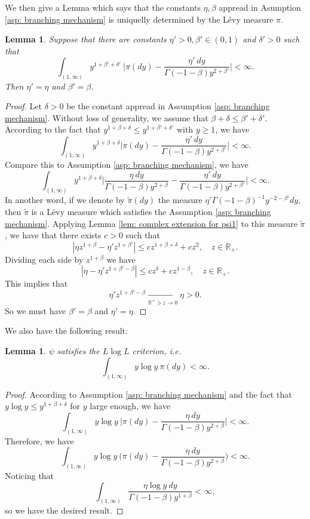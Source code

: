 \documentclass[12pt,a4paper]{amsart}
\theoremstyle{plain}
\newtheorem{lem}[thm]{Lemma}
\theoremstyle{definition}
\numberwithin{equation}{section}
\begin{document}
	We then give a Lemma which says that the constants $\eta, \beta$ appread in Asumption \ref{asp: branching mechanism} is uniquelly determined by the L\'evy measure $\pi$.
\begin{lem}
\label{lem: unique of beta and eta}
	Suppose that there are constants $\eta'>0, \beta'\in (0,1)$ and $\delta' > 0$ such that
\[
	 \int_{(1,\infty)}y^{1+\beta' +\delta'}~\Big|\pi(dy)-\frac{\eta'~dy}{\Gamma(-1-\beta)y^{2+\beta'}}\Big| <\infty.
\]
	Then $\eta'= \eta$ and $\beta ' = \beta$.
\end{lem}
\begin{proof}
	Let $\delta> 0$ be the constant appread in Assumption \ref{asp: branching mechanism}.
	Without loss of generality, we assume that $\beta+\delta \leq \beta'+ \delta'$.
	According to the fact that $y^{1+\beta+ \delta} \leq y^{1+\beta'+\delta'}$ with $y \geq 1$, we have
\[
	\int_{(1,\infty)} y^{1+\beta + \delta} \Big|\pi(dy)-\frac{\eta'~dy}{\Gamma(-1-\beta)y^{2+\beta'}}\Big| <\infty.
\]
	Compare this to Assumption \ref{asp: branching mechanism}, we have
\[
	\int_{(1,\infty)} y^{1+\beta + \delta} \Big|\frac{\eta~dy}{\Gamma(-1-\beta)y^{2+\beta}}-\frac{\eta'~dy}{\Gamma(-1-\beta)y^{2+\beta'}}\Big| <\infty.
\]
	In another word, if we denote by $\tilde \pi(dy)$ the measure $\eta' \Gamma(-1-\beta)^{-1} y^{-2-\beta'} dy$, then $\tilde \pi$ is a L\'evy measure which satisfies the Assumption \ref{asp: branching mechanism}.
	Applying Lemma \ref{lem: complex extension for psi1} to this measure $\tilde \pi$, we have that there exists $c>0$ such that
\[
	|\eta z^{1+\beta} - \eta' z^{1+\beta'} | 
	\leq cz^{1+\beta+ \delta}+cz^2,
	\quad z \in \mathbb R_+.
\]
	Dividing each side by $z^{1+\beta}$ we have
\[
	|\eta - \eta' z^{1+\beta' - \beta} | 
	\leq cz^{\delta}+cz^{1-\beta},
	\quad z \in \mathbb R_+.
\]
	This implies that
\[
	\eta' z^{1+\beta' - \beta} \xrightarrow[\mathbb R^+\ni z\to 0]{} \eta >0.
\]
	So we must have $\beta'= \beta$ and $\eta'= \eta$.
\end{proof}

	We also have the following result:
\begin{lem}
\label{lem: LlogL criterion}
    $\psi$ satisfies the $L \log L$ criterion, i.e.
\[
    \int_{(1,\infty)} y \log y~\pi(dy)< \infty.
\]
\end{lem}
\begin{proof}
	According to Assumption \ref{asp: branching mechanism} and the fact that $y\log y \leq y^{1+\beta+\delta}$ for $y$ large enough, we have
\[
	\int_{(1,\infty)}y\log y~\Big|\pi(dy)-\frac{\eta~dy}{\Gamma(-1-\beta)y^{2+\beta}}\Big| <\infty.
\]
	Therefore, we have
\[
	\int_{(1,\infty)}y\log y~\Big(\pi(dy)-\frac{\eta~dy}{\Gamma(-1-\beta)y^{2+\beta}}\Big) < \infty.
\]
	Noticing that
\[
	\int_{(1,\infty)}\frac{\eta \log y~dy}{\Gamma(-1-\beta)y^{1+\beta}} < \infty,
\]
	so we have the desired result.
\end{proof}
\end{document}
